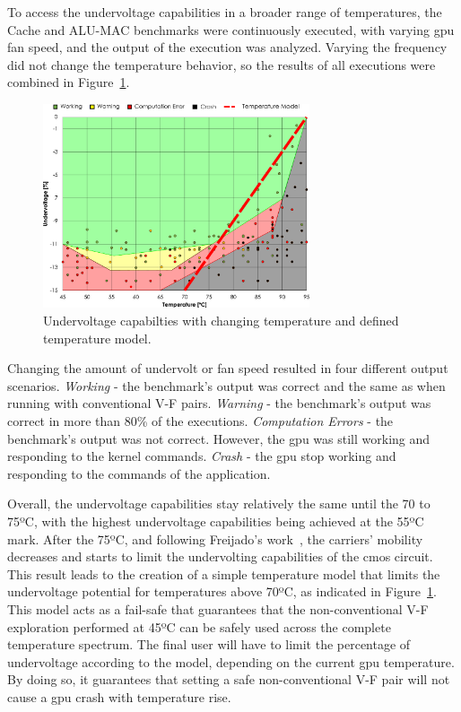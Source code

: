 To access the undervoltage capabilities in a broader range of temperatures, the Cache and ALU-MAC benchmarks were continuously executed, with varying \acrshort{gpu} fan speed, and the output of the execution was analyzed. Varying the frequency did not change the temperature behavior, so the results of all executions were combined in Figure~\ref{fig:temp_model}. 

\begin{figure}[htb]
    \centering
        \includegraphics[width=0.7\textwidth]{Figures/GPU_characterization/UndervoltageWithTemperature.pdf}
        \caption{Undervoltage capabilties with changing temperature and defined temperature model.}
    \label{fig:temp_model}
\end{figure}

Changing the amount of undervolt or fan speed resulted in four different output scenarios. \textit{Working} - the benchmark's output was correct and the same as when running with conventional V-F pairs. \textit{Warning} - the benchmark's output was correct in more than 80\% of the executions. \textit{Computation Errors} - the benchmark's output was not correct. However, the \acrshort{gpu} was still working and responding to the kernel commands. \textit{Crash} - the \acrshort{gpu} stop working and responding to the commands of the application.

Overall, the undervoltage capabilities stay relatively the same until the 70 to 75ºC, with the highest undervoltage capabilities being achieved at the 55ºC mark. After the 75ºC, and following Freijado's work~\cite{freijedo_modeling_2012}, the carriers' mobility decreases and starts to limit the undervolting capabilities of the \acrshort{cmos} circuit. This result leads to the creation of a simple temperature model that limits the undervoltage potential for temperatures above 70ºC, as indicated in Figure~\ref{fig:temp_model}. This model acts as a fail-safe that guarantees that the non-conventional V-F exploration performed at 45ºC can be safely used across the complete temperature spectrum. The final user will have to limit the percentage of undervoltage according to the model, depending on the current \acrshort{gpu} temperature. By doing so, it guarantees that setting a safe non-conventional V-F pair will not cause a \acrshort{gpu} crash with temperature rise.




